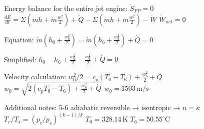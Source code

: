 Energy balance for the entire jet engine:  
\( \dot{S}_{FP} = 0 \)  
\( \frac{dE}{dt} = \Sigma (\dot{m} h + \dot{m} \frac{w^2}{2}) + \dot{Q} - \Sigma (\dot{m} h + \dot{m} \frac{w^2}{2}) - \dot{W} \)  
\( \dot{W}_{net} = 0 \)  

Equation:  
\( \dot{m} (h_0 + \frac{w_0^2}{2}) = \dot{m} (h_6 + \frac{w_6^2}{2}) + \dot{Q} = 0 \)  

Simplified:  
\( h_0 - h_6 + \frac{w_0^2}{2} - \frac{w_6^2}{2} + \dot{Q} = 0 \)  

Velocity calculation:  
\( w_0^2 / 2 = c_p (T_0 - T_6) + \frac{w_6^2}{2} + \dot{Q} \)  
\( w_0 = \sqrt{2 (c_p T_0 - T_6) + \frac{w_6^2}{2} + \dot{Q}} \)  
\( w_0 = 1503 \, \text{m/s} \)  

Additional notes:  
5-6 adiabatic reversible → isentropic → \( n = \kappa \)  
\( T_c / T_s = (p_c / p_s)^{(k-1)/k} \)  
\( T_0 = 328.14 \, \text{K} \)  
\( T_6 = 50.55^\circ \text{C} \)